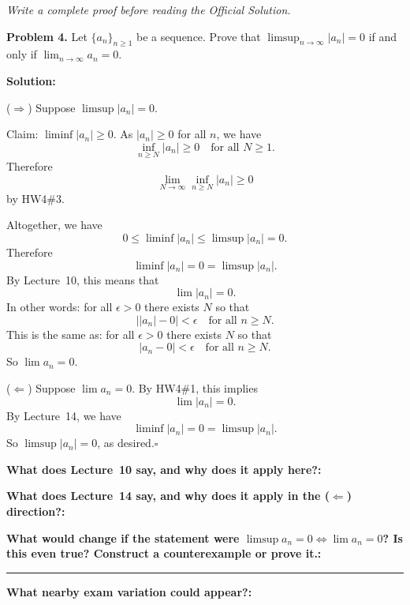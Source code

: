 \documentclass[12pt]{article}
\newcommand{\fillfield}[1]{%
  \par\noindent\textbf{#1:}\enspace\hrulefill\par\vspace{3pt}%
}
\newcommand{\fillfieldlong}[1]{%
  \par\noindent\textbf{#1:}\par\vspace{1.5cm}%
  \noindent\rule{\linewidth}{0.35pt}\par\vspace{4pt}%
}
\newcommand{\writespace}[1]{\vspace{#1}}
\begin{document}
\newpage

\begin{tcolorbox}[
  enhanced, breakable,
  colback  = pass5gray,
  colframe = black!38,
  fonttitle = \bfseries,
  title = {Pass 5 \enspace\textbf{--}\enspace Full Proof Attempt}
]
\small\itshape Write a complete proof before reading the Official Solution.\par
\normalfont\normalsize
\writespace{19cm}
\end{tcolorbox}

\newpage

\begin{tcolorbox}[
  enhanced, breakable,
  colback  = solgreen,
  colframe = green!45!black,
  fonttitle = \bfseries,
  title = {\textsc{Official Solution}\hfill Homework 5 -- Selected Solutions}
]
\textbf{Problem 4.}
Let $\{a_n\}_{n \geq 1}$ be a sequence.
Prove that $\limsup_{n \to \infty} |a_n| = 0$ if and only if
$\lim_{n \to \infty} a_n = 0$.

\medskip
\textbf{Solution:}

\medskip
($\Rightarrow$) Suppose $\limsup |a_n| = 0$.

Claim: $\liminf |a_n| \geq 0$.
As $|a_n| \geq 0$ for all $n$, we have
\[
  \inf_{n \geq N} |a_n| \geq 0 \quad \text{for all } N \geq 1.
\]
Therefore
\[
  \lim_{N \to \infty} \inf_{n \geq N} |a_n| \geq 0
\]
by HW4\#3.

Altogether, we have
\[
  0 \leq \liminf |a_n| \leq \limsup |a_n| = 0.
\]
Therefore
\[
  \liminf |a_n| = 0 = \limsup |a_n|.
\]
By Lecture~10, this means that
\[
  \lim |a_n| = 0.
\]
In other words: for all $\epsilon > 0$ there exists $N$ so that
\[
  \bigl||a_n| - 0\bigr| < \epsilon \quad \text{for all } n \geq N.
\]
This is the same as: for all $\epsilon > 0$ there exists $N$ so that
\[
  |a_n - 0| < \epsilon \quad \text{for all } n \geq N.
\]
So $\lim a_n = 0$.

\medskip
($\Leftarrow$) Suppose $\lim a_n = 0$.
By HW4\#1, this implies
\[
  \lim |a_n| = 0.
\]
By Lecture~14, we have
\[
  \liminf |a_n| = 0 = \limsup |a_n|.
\]
So $\limsup |a_n| = 0$, as desired.\hfill$\square$
\end{tcolorbox}

\bigskip

\begin{tcolorbox}[
  enhanced, breakable,
  colback  = reflectcyan,
  colframe = cyan!55!black,
  fonttitle = \bfseries,
  title = {\textsc{Reflection \& Variation}}
]
\fillfield{What does Lecture~10 say, and why does it apply here?}
\fillfield{What does Lecture~14 say, and why does it apply in the ($\Leftarrow$) direction?}
\fillfieldlong{%
  What would change if the statement were $\limsup a_n = 0 \iff \lim a_n = 0$?
  Is this even true? Construct a counterexample or prove it.}
\fillfield{What nearby exam variation could appear?}
\end{tcolorbox}
\end{document}
